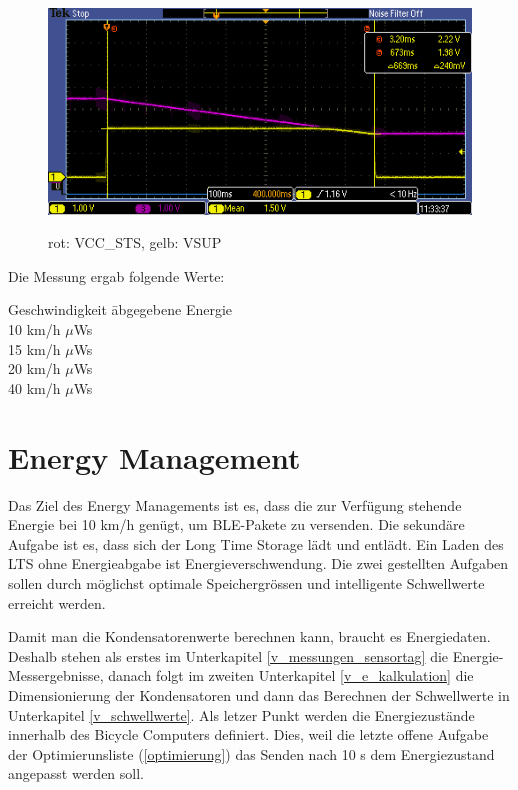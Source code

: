 \begin{figure}[ht]
  \includegraphics[width=1.0\textwidth]{3Vorgehen/imag/EnergieEMChip15kmh.PNG}
  \label{EnergieEMChip15kmh} 
  \caption{rot: VCC\_STS, gelb: VSUP}
\end{figure}

Die Messung ergab folgende Werte:

\begin{tabbing}
    Geschwindigkeit   	\quad\= abgegebene Energie    \\[0.8ex]
    10 km/h		         $\mu$Ws\\
	15 km/h		         $\mu$Ws\\
	20 km/h		         $\mu$Ws\\
	40 km/h		         $\mu$Ws\\
\end{tabbing}

\section{Energy Management}

Das Ziel des Energy Managements ist es, dass die zur Verfügung stehende Energie bei 10 km/h genügt, um BLE-Pakete zu versenden. Die sekundäre Aufgabe ist es, dass sich der Long Time Storage lädt und entlädt. Ein Laden des LTS ohne Energieabgabe ist Energieverschwendung. Die zwei gestellten Aufgaben sollen durch möglichst optimale Speichergrössen und intelligente Schwellwerte erreicht werden.

Damit man die Kondensatorenwerte berechnen kann, braucht es Energiedaten. Deshalb stehen als erstes im Unterkapitel \ref{v_messungen_sensortag} die Energie-Messergebnisse, danach folgt im zweiten Unterkapitel \ref{v_e_kalkulation} die Dimensionierung der Kondensatoren und dann das Berechnen der Schwellwerte in Unterkapitel \ref{v_schwellwerte}. Als letzer Punkt werden die Energiezustände innerhalb des Bicycle Computers definiert. Dies, weil die letzte offene Aufgabe der Optimierunsliste (\ref{optimierung}) das Senden nach 10 s dem Energiezustand angepasst werden soll.


